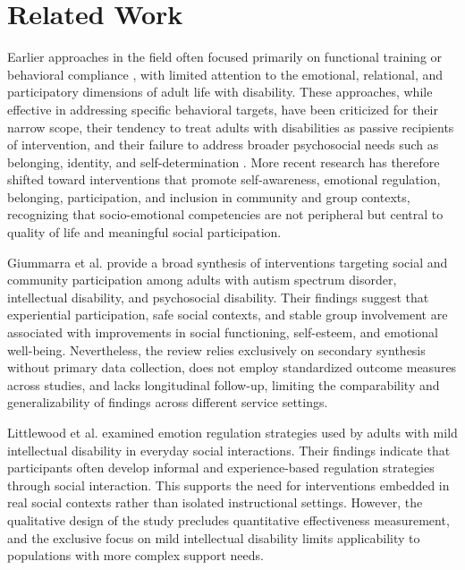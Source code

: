 \documentclass[journal]{IEEEtran}
\begin{document}
\section{Related Work}

Earlier approaches in the field often focused primarily on functional training or behavioral compliance \cite{emerson2001}, with limited attention to the emotional, relational, and participatory dimensions of adult life with disability. These approaches, while effective in addressing specific behavioral targets, have been criticized for their narrow scope, their tendency to treat adults with disabilities as passive recipients of intervention, and their failure to address broader psychosocial needs such as belonging, identity, and self-determination \cite{mcnaughton2025,witwer2022}. More recent research has therefore shifted toward interventions that promote self-awareness, emotional regulation, belonging, participation, and inclusion in community and group contexts, recognizing that socio-emotional competencies are not peripheral but central to quality of life and meaningful social participation.

Giummarra et al. \cite{giummarra2022} provide a broad synthesis of interventions targeting social and community participation among adults with autism spectrum disorder, intellectual disability, and psychosocial disability. Their findings suggest that experiential participation, safe social contexts, and stable group involvement are associated with improvements in social functioning, self-esteem, and emotional well-being. Nevertheless, the review relies exclusively on secondary synthesis without primary data collection, does not employ standardized outcome measures across studies, and lacks longitudinal follow-up, limiting the comparability and generalizability of findings across different service settings.

Littlewood et al. \cite{littlewood2018} examined emotion regulation strategies used by adults with mild intellectual disability in everyday social interactions. Their findings indicate that participants often develop informal and experience-based regulation strategies through social interaction. This supports the need for interventions embedded in real social contexts rather than isolated instructional settings. However, the qualitative design of the study precludes quantitative effectiveness measurement, and the exclusive focus on mild intellectual disability limits applicability to populations with more complex support needs.
\end{document}
